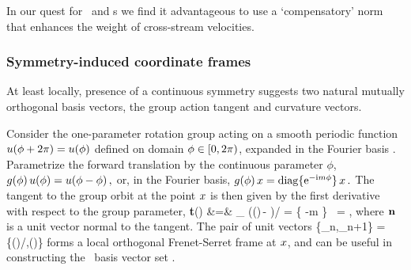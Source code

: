 In our quest for \reqva\ and \rpo s we
find it advantageous to use a `compensatory' norm %
that enhances the weight of cross-stream velocities.

\subsubsection{Symmetry-induced coordinate frames}
\label{s:symmIndCoo}

At least locally, presence of a continuous symmetry suggests two
natural mutually orthogonal basis vectors, the group action tangent and
curvature vectors.

Consider the one-parameter rotation group  acting on a smooth
periodic function $u({\bf \phi} + 2\pi) = u({\bf \phi})$ defined on domain
${\bf \phi} \in [0,2\pi)$, expanded in the Fourier basis
.
Parametrize the forward
translation by the continuous parameter $\phi$,
\(
    g(\phi)\,u({\bf \phi}) = u({\bf \phi}-\phi)
\,,
\)
or, in the Fourier basis,
\(
   g(\phi) \,x = \mathrm{diag}\{ \mathrm{e}^{-\mathrm{i}m\phi} \} \,x
\,.
\)
The tangent to the group orbit at the point $\ssp$ is then given by
the first derivative with respect to the group parameter,
\bea
   {\bf t}(\ssp) &=&
   \lim_{\gSpace{}}
   \left(\LieEl(\gSpace)\,\ssp - \ssp\right)/\gSpace
   = \{ -m \} \, \ssp = \Lg \ssp,
\label{eq:tang}
\eea
where $\mathbf{n}$ is a unit vector normal to the tangent. The pair of unit vectors
    \PC{2011-10-28
    ``As $\Norm{\LieEl(\gSpace)\slicep}$ is a constant, for the group tangent
    vector $\Lg_\gSpace \slicep$ evaluated at $\slicep$ \refeq{eq:tang}
    $\braket{\slicep}{\Lg_\theta\,\slicep}$ vanishes ($\Lg_{\theta}$ is
    antisymmetric).''
The state vector $\ssp$ is not normal to \normVec(\ssp), as $\braket{\ssp
\Lg^2}{\ssp} = - \Norm{\groupTan(\ssp)}^2 \neq 0$, but can one use it to
produce from $\ssp$ the 3. local eigenbasis unit vector? Have not thought
that through. If we do that here, need to rewrite text leading to
\refeq{PCsectQ0}.
    }
\beq
\{{\be_n},{\be_{n+1}}\} =
\{\groupTan(\ssp)/\Norm{\groupTan(\ssp)},\normVec(\ssp)\}
forms a local orthogonal Frenet-Serret frame at $\ssp$, and can be useful
in constructing the \statesp\ basis vector set .

